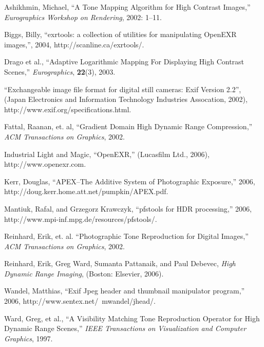 \begin{thebibliography}{1}

 Ashikhmin, Michael, ``A Tone Mapping Algorithm for High Contrast Images,''
{\em Eurographics Workshop on Rendering}, 2002: 1--11.

 Biggs, Billy, ``exrtools: a collection of utilities for manipulating
OpenEXR images,'', 2004, http://scanline.ca/exrtools/.

 Drago et al., ``Adaptive Logarithmic Mapping For Displaying High Contrast Scenes,''
{\em Eurographics}, {\bf 22}(3), 2003.

 ``Exchangeable image file format for digital still cameras: Exif Version 2.2'',
(Japan Electronics and Information Technology Industries Assocation, 2002),
http://www.exif.org/specifications.html.

 Fattal, Raanan, et. al, ``Gradient Domain High Dynamic Range Compression,''
{\em ACM Transactions on Graphics}, 2002.

 Industrial Light and Magic, ``OpenEXR,'' (Lucasfilm Ltd., 2006),
http://www.openexr.com.

 Kerr, Douglas, ``APEX--The Additive System of Photographic Exposure,'' 2006,
http://doug.kerr.home.att.net/pumpkin/APEX.pdf.

 Mantiuk, Rafal, and Grzegorz Krawczyk, ``pfstools for HDR processing,'' 2006,
http://www.mpi-inf.mpg.de/resources/pfstools/.

 Reinhard, Erik, et. al. ``Photographic Tone Reproduction for Digital Images,''
{\em ACM Transactions on Graphics}, 2002.

 Reinhard, Erik, Greg Ward, Sumanta Pattanaik, and Paul Debevec,
{\em High Dynamic Range Imaging}, (Boston: Elsevier, 2006).

 Wandel, Matthias, ``Exif Jpeg header and thumbnail manipulator program,'' 2006,
http://www.sentex.net/~mwandel/jhead/.

 Ward, Greg, et al., ``A Visibility Matching Tone Reproduction Operator for High Dynamic Range Scenes,''
{\em IEEE Transactions on Visualization and Computer Graphics}, 1997.

\end{thebibliography}
